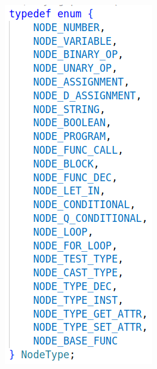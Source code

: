 \documentclass{llncs}
\begin{document}
\begin{figure}[h]
\centering
\begin{minipage}{0.3\textwidth}
    \centering
    \includegraphics[width=\textwidth]{images/node_type.png}

\end{minipage}
\end{figure}
\end{document}
